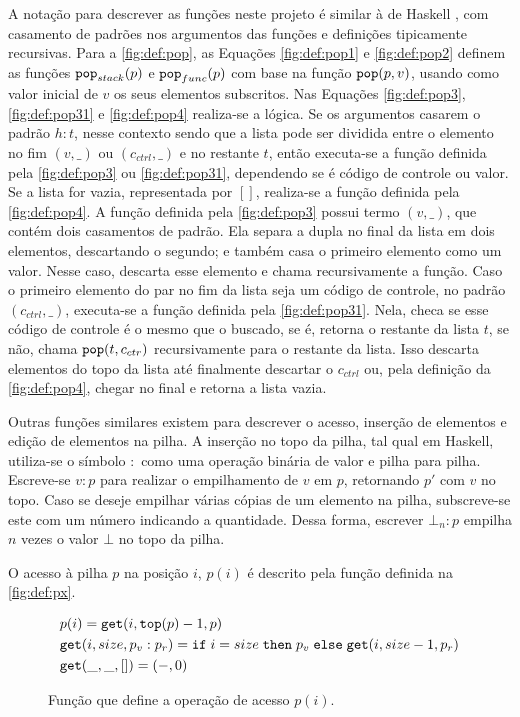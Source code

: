 A notação para descrever as funções neste projeto é similar à de Haskell \cite{HASKELL}, com casamento de padrões nos argumentos das funções e definições tipicamente recursivas. Para a \autoref{fig:def:pop}, as Equações \ref{fig:def:pop1} e \ref{fig:def:pop2} definem as funções $\texttt{pop}_{stack}(p)$ e $\texttt{pop}_{func}(p)$ com base na função $\texttt{pop}(p, v)$, usando como valor inicial de $v$ os seus elementos subscritos. Nas Equações \ref{fig:def:pop3}, \ref{fig:def:pop31} e \ref{fig:def:pop4} realiza-se a lógica. Se os argumentos casarem o padrão $h : t$, nesse contexto sendo que a lista pode ser dividida entre o elemento no fim $(v, \_)$ ou $(c_{ctrl}, \_)$ e no restante $t$, então executa-se a função definida pela \autoref{fig:def:pop3} ou \ref{fig:def:pop31}, dependendo se é código de controle ou valor. Se a lista for vazia, representada por $[]$, realiza-se a função definida pela \autoref{fig:def:pop4}. A função definida pela \autoref{fig:def:pop3} possui termo $(v,\_)$, que contém dois casamentos de padrão. Ela separa a dupla no final da lista em dois elementos, descartando o segundo; e também casa o primeiro elemento como um valor. Nesse caso, descarta esse elemento e chama recursivamente a função. Caso o primeiro elemento do par no fim da lista seja um código de controle, no padrão $(c_{ctrl},\_)$, executa-se a função definida pela \autoref{fig:def:pop31}. Nela, checa se esse código de controle é o mesmo que o buscado, se é, retorna o restante da lista $t$, se não, chama $\texttt{pop}(t, c_{ctr})$ recursivamente para o restante da lista. Isso descarta elementos do topo da lista até finalmente descartar o $c_{ctrl}$ ou, pela definição da \autoref{fig:def:pop4}, chegar no final e retorna a lista vazia.

Outras funções similares existem para descrever o acesso, inserção de elementos e edição de elementos na pilha. A inserção no topo da pilha, tal qual em Haskell, utiliza-se o símbolo $:$ como uma operação binária de valor e pilha para pilha. Escreve-se $v : p$ para realizar o empilhamento de $v$ em $p$, retornando $p'$ com $v$ no topo. Caso se deseje empilhar várias cópias de um elemento na pilha, subscreve-se este com um número indicando a quantidade. Dessa forma, escrever $\bot_n : p$ empilha $n$ vezes o valor $\bot$ no topo da pilha. 

O acesso à pilha $p$ na posição $i$, $p(i)$ é descrito pela função definida na \autoref{fig:def:px}.

\begin{figure}[ht]
	\begin{align}
	&p(i) = \texttt{get}(i, \texttt{top}(p) - 1, p) \label{fig:def:px1}\\
	&\texttt{get}(i, size, p_v : p_r) = \texttt{if}\;i = size \;\texttt{then}\;p_v\;\texttt{else}\;\texttt{get}(i, size - 1, p_r) \label{fig:def:px2}\\
	&\texttt{get}(\_, \_, []) = (-,0) \label{fig:def:px3}
	\end{align}
	\caption{Função que define a operação de acesso $p(i)$.}
	\label{fig:def:px}
\end{figure}

